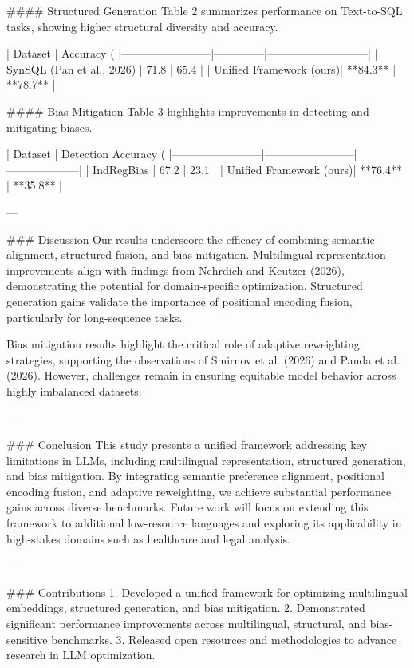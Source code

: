 #### Structured Generation
Table 2 summarizes performance on Text-to-SQL tasks, showing higher structural diversity and accuracy.

| Dataset                | Accuracy (%
|------------------------|--------------|---------------------------|
| SynSQL (Pan et al., 2026) | 71.8         | 65.4                      |
| Unified Framework (ours)| **84.3**     | **78.7**                  |

#### Bias Mitigation
Table 3 highlights improvements in detecting and mitigating biases.

| Dataset                | Detection Accuracy (%
|------------------------|------------------------|--------------------|
| IndRegBias             | 67.2                   | 23.1              |
| Unified Framework (ours)| **76.4**               | **35.8**          |

---

### Discussion
Our results underscore the efficacy of combining semantic alignment, structured fusion, and bias mitigation. Multilingual representation improvements align with findings from Nehrdich and Keutzer (2026), demonstrating the potential for domain-specific optimization. Structured generation gains validate the importance of positional encoding fusion, particularly for long-sequence tasks.

Bias mitigation results highlight the critical role of adaptive reweighting strategies, supporting the observations of Smirnov et al. (2026) and Panda et al. (2026). However, challenges remain in ensuring equitable model behavior across highly imbalanced datasets.

---

### Conclusion
This study presents a unified framework addressing key limitations in LLMs, including multilingual representation, structured generation, and bias mitigation. By integrating semantic preference alignment, positional encoding fusion, and adaptive reweighting, we achieve substantial performance gains across diverse benchmarks. Future work will focus on extending this framework to additional low-resource languages and exploring its applicability in high-stakes domains such as healthcare and legal analysis.

---

### Contributions
1. Developed a unified framework for optimizing multilingual embeddings, structured generation, and bias mitigation.
2. Demonstrated significant performance improvements across multilingual, structural, and bias-sensitive benchmarks.
3. Released open resources and methodologies to advance research in LLM optimization.

